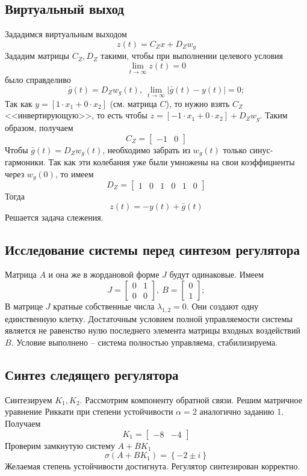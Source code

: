 \documentclass[a4paper, 12pt]{article}
\begin{document}
    \subsection{Виртуальный выход}
    Зададимся виртуальным выходом
    $$
    z(t)=C_Zx+D_Zw_g
    $$
    Зададим матрицы $C_Z,D_Z$ такими, чтобы при выполнении целевого условия
    $$
    \lim\limits_{t\to\infty}z(t)=0
    $$
    было справделиво
    $$
    \bar{g}(t)=D_Zw_g(t),\ \lim\limits_{t\to\infty}|\bar{g}(t)-y(t)|=0;
    $$
    Так как $y=\left[1\cdot x_1+0\cdot x_2\right]$ (см. матрица $C$), то нужно взять
    $C_Z$ <<инвертирующую>>, то есть чтобы $z=\left[-1\cdot x_1 + 0\cdot x_2\right] +D_Zw_g$.
    Таким образом, получаем
    $$
    C_Z=\begin{bmatrix}
        -1 &0
    \end{bmatrix}
    $$
    Чтобы $\bar{g}(t)=D_Zw_g(t)$, необходимо забрать из $w_g(t)$ только синус-гармоники.
    Так как эти колебания уже были умножены на свои коэффициенты через $w_g(0)$, то имеем
    $$
    D_Z=\begin{bmatrix}
        1 &0 &1 &0 &1 &0
    \end{bmatrix}
    $$
    Тогда
    $$
    z(t)=-y(t)+\bar{g}(t)
    $$
    Решается задача слежения.


    \subsection{Исследование системы перед синтезом регулятора}
    Матрица $A$ и она же в жордановой форме $J$ будут одинаковые. Имеем
    $$
    J=\begin{bmatrix}
        0 &1\\
        0 &0
    \end{bmatrix},\ B=\begin{bmatrix}
        0\\1
    \end{bmatrix};
    $$
    В матрице $J$ кратные собственные числа $\lambda_{1,2}=0$. Они создают одну единственную клетку.
    Достаточным условием полной управляемости системы является не равенство нулю последнего элемента
    матрицы входных воздействий $B$. Условие выполнено -- система полностью управляема, стабилизируема.


    \subsection{Синтез следящего регулятора}
    Синтезируем $K_1,K_2$. Рассмотрим компоненту обратной связи. Решим
    матричное уравнение Риккати при степени устойчивости $\alpha=2$ аналогично заданию 1.
    Получаем
    $$
    K_1=\begin{bmatrix}
        -8   &-4
    \end{bmatrix}
    $$
    Проверим замкнутую систему $A+BK_1$
    $$
    \sigma\left( A+BK_1 \right)=\left\{ -2\pm i \right\}
    $$
    Желаемая степень устойчивости достигнута. Регулятор синтезирован корректно.
\end{document}
